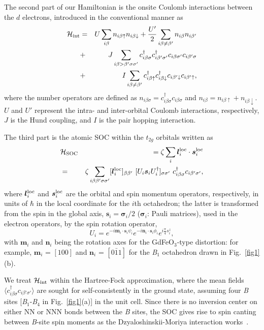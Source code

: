 \documentclass[aps,twocolumn,prb,preprintnumbers,amsmath,amssymb]{revtex4-2}
\begin{document}
The second part of our Hamiltonian is the onsite Coulomb interactions between the $d$ electrons, introduced in the conventional manner as 
\begin{eqnarray}
{\cal H}_{\rm int} 
&=& U \sum_{i \beta} n_{i \beta \uparrow} n_{i \beta \downarrow} + \frac{U'}{2} \sum_{i \beta \neq \beta'} n_{i \beta} n_{i \beta'} \notag \\
&+& J \sum_{i \beta > \beta' \sigma \sigma'} c^\dagger_{i \beta \sigma} c^\dagger_{i \beta' \sigma'} c_{i \beta \sigma'} c_{i \beta' \sigma} \notag \\
&+& I \sum_{i \beta \neq \beta'} c^\dagger_{i \beta \uparrow} c^\dagger_{i \beta \downarrow} c_{i \beta' \downarrow} c_{i \beta' \uparrow},
\end{eqnarray}
where the number operators are defined as 
 $n_{i \beta \sigma} =c^{\dagger}_{i \beta \sigma}c_{i \beta \sigma}$ and $n_{i \beta} = n_{i \beta \uparrow} +n_{i \beta \downarrow}$. 
$U$ and $U'$ represent the intra- and inter-orbital Coulomb interactions, respectively, $J$ is the Hund coupling, and $I$ is the pair 
hopping interaction. 

The third part is the atomic SOC within the $t_{2g}$ orbitals written as 
\begin{eqnarray}
&{\cal H}_{\rm SOC}&\ = \zeta \sum_i {\bm l}^{\rm loc}_i \cdot {\bm s}^{\rm loc}_i  \notag\\
&=& \zeta \sum_{i \beta \beta' \sigma \sigma'} [ {\bm l}^{\rm loc}_i ]_{\beta \beta'} \ 
  [U_i {\bm s}_i U_i^\dagger]_{\sigma \sigma'} \ c^{\dagger}_{i\beta \sigma} c_{i\beta' \sigma'}, \label{SOC}
\end{eqnarray}
where $ {\bm l}^{\rm loc}_i$ and ${\bm s}^{\rm loc}_i$ are the orbital and spin momentum operators, respectively, in units of $\hbar$ in the local coordinate for the $i$th octahedron; 
 the latter is transformed from the spin in the global axis, ${\bm s}_i = {\bm \sigma}_i / 2$ (${\bm \sigma}_i$: Pauli matrices), 
 used in the electron operators, by the spin rotation operator, 
\begin{equation}
U_i = e^{- i {\bm m}_i \cdot {\bm s}_i \psi_i}  e^{- i {\bm n}_i \cdot {\bm s}_i \phi_i} e^{i \frac{\pi}{4}s^z_i}, 
\end{equation}
with ${\bm m}_i$ and  ${\bm n}_i$ being the rotation axes for the GdFeO$_3$-type distortion: 
for example, ${\bm m}_i$ = $[100]$ and ${\bm n}_i$ =  $[0\bar{1}1]$ for the {\it B}$_1$ octahedron drawn in Fig.~\ref{fig1}(b). 

We treat ${\cal H}_{\rm int} $ within the Hartree-Fock approximation, 
 where the mean fields $\langle c^{\dagger}_{i\beta \sigma} c_{i\beta' \sigma'} \rangle$ are sought for self-consistently in the ground state,  
 assuming four {\it B} sites [{\it B}$_1$-{\it B}$_4$ in Fig.~\ref{fig1}(a)] in the unit cell. 
Since there is no inversion center on either NN or NNN bonds
between the {\it B} sites, 
 the SOC gives rise to spin canting between {\it B}-site spin moments as the Dzyaloshinskii-Moriya interaction works~\cite{dzyaloshinsky, moriya}. 
\end{document}
